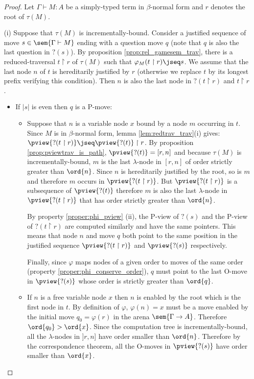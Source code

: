 \begin{proof}
Let $\Gamma \vdash M : A$ be a simply-typed term in $\beta$-normal form
and $r$ denotes the root of $\tau(M)$.

\noindent
(i) Suppose that $\tau(M)$ is incrementally-bound.
Consider a justified sequence of move $s \in \sem{\Gamma \vdash M}$
ending with a question move $q$ (note that $q$ is also the last question in $?(s)$).
By proposition \ref{prop:rel_gamesem_trav}, there
is a reduced-traversal $t \upharpoonright r$ of $\tau(M)$ such that $\varphi_{M}(t \upharpoonright r) \jseq s$.
We assume that the last node $n$ of $t$ is hereditarily justified by $r$ (otherwise we replace $t$ by its longest prefix verifying this condition).
Then $n$ is also the last node in $?(t \upharpoonright r)$ and $t \upharpoonright r$.

\begin{itemize}
\item If $|s|$ is even then $q$ is a P-move:
\begin{itemize}
\item Suppose that $n$ is a variable node $x$ bound by a node $m$ occurring in $t$.
Since $M$ is in $\beta$-normal form, lemma \ref{lem:redtrav_trav}(i) gives:
$ \pview{?(t \upharpoonright r)} \jseq \pview{?(t)} \upharpoonright  r$.
By proposition \ref{prop:pviewtrav_is_path}, $\pview{?(t)} = [r,n]$ and because
$\tau(M)$ is incrementally-bound, $m$ is the last $\lambda$-node in $[r,n]$ of order strictly greater than $\ord{n}$.
Since $n$ is hereditarily justified by the root, so is $m$ and therefore $m$ occurs in $\pview{?(t \upharpoonright r)}$.
But $\pview{?(t \upharpoonright r)}$ is a subsequence of $\pview{?(t)}$ therefore $m$ is also the last $\lambda$-node
in $\pview{?(t \upharpoonright  r)}$ that has order strictly greater than $\ord{n}$.

By property \ref{proper:phi_pview} (ii), the P-view of $?(s)$ and the P-view of $?(t \upharpoonright r)$ are computed
similarly and have the same pointers. This means that
node $n$ and  move $q$ both point to the same position in
the justified sequence $\pview{?(t\upharpoonright r)}$ and $\pview{?(s)}$ respectively.

Finally, since $\varphi$ maps nodes of a given order to moves of the same order (property \ref{proper:phi_conserve_order}),
$q$ must point to the last O-move in $\pview{?(s)}$ whose
order is strictly greater than $\ord{q}$.


\item If $n$ is a free variable node $x$ then $n$ is enabled by the root which is the first node in $t$.
By definition of $\varphi$, $\varphi(n) = x$ must be a move enabled by the initial move $q_0 = \varphi(r)$ in the arena $\sem{\Gamma \rightarrow A}$.
Therefore $\ord{q_0} > \ord{x}$.
Since the computation tree is incrementally-bound, all the $\lambda$-nodes in $]r,n]$ have order smaller than $\ord{n}$. Therefore by the correspondence theorem,
all the O-moves in $\pview{?(s)}$ have order smaller than $\ord{x}$.
\end{itemize}




\end{itemize}
\end{proof}

